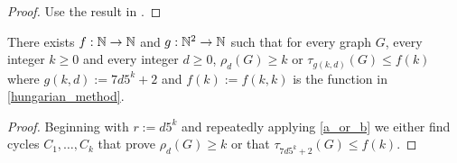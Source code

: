 \documentclass{patmorin}
\renewcommand{\ge}{\geqslant}
\renewcommand{\le}{\leqslant}
\begin{document}
\begin{proof}
  Use the result in \citet{gyarfas.lehel:helly}.
\end{proof}

\begin{thm}
  There exists $f:\mathbb{N}\to\mathbb{N}$ and $g:\mathbb{N}^2\to\mathbb{N}$ such that for every graph $G$, every integer $k\ge 0$ and every integer $d\ge 0$, $\rho_d(G)\ge k$ or $\tau_{g(k,d)}(G)\le f(k)$ where $g(k,d):=7d5^k+2$ and $f(k):=f(k,k)$ is the function in \cref{hungarian_method}.
\end{thm}

\begin{proof}
  Beginning with $r:=d5^k$ and repeatedly applying \cref{a_or_b} we either find cycles $C_1,\ldots,C_k$ that prove $\rho_d(G)\ge k$ or that $\tau_{7d5^k+2}(G) \le f(k)$.
\end{proof}



\end{document}
